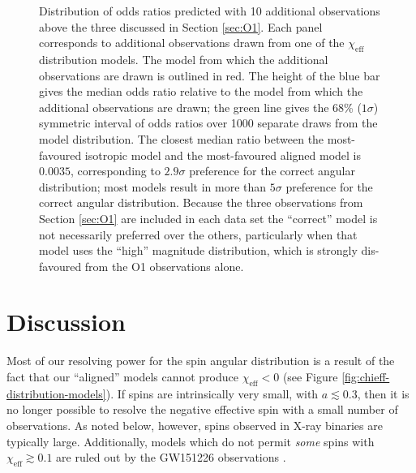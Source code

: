 \documentclass[modern,linenumbers]{aastex61}
\newcommand{\chieff}{\chi_\mathrm{eff}}
\newcommand{\OTwoSigmaIsoAlignedMin}{2.9}
\newcommand{\OTwoOddsIsoAlignedMin}{0.0035}
\begin{document}
\begin{figure}
  \caption{\label{fig:O2-predictions} Distribution of odds ratios
    predicted with 10 additional observations above the three
    discussed in Section \ref{sec:O1}.  Each panel corresponds to
    additional observations drawn from one of the $\chieff$
    distribution models.  The model from which the additional
    observations are drawn is outlined in red.  The height of the blue
    bar gives the median odds ratio relative to the model from which
    the additional observations are drawn; the green line gives the
    68\% ($1 \sigma$) symmetric interval of odds ratios over 1000
    separate draws from the model distribution.  The closest median
    ratio between the most-favoured isotropic model and the
    most-favoured aligned model is $\OTwoOddsIsoAlignedMin$,
    corresponding to $\OTwoSigmaIsoAlignedMin\sigma$ preference for
    the correct angular distribution; most models result in more than
    $5\sigma$ preference for the correct angular distribution.
    Because the three observations from Section \ref{sec:O1} are
    included in each data set the ``correct'' model is not necessarily
    preferred over the others, particularly when that model uses the
    ``high'' magnitude distribution, which is strongly dis-favoured
    from the O1 observations alone.}
\end{figure}

\section{Discussion}
\label{sec:discussion}

Most of our resolving power for the spin angular distribution is a
result of the fact that our ``aligned'' models cannot produce
$\chieff < 0$ (see Figure \ref{fig:chieff-distribution-models}).  If
spins are intrinsically very small, with $a \lesssim 0.3$, then it is
no longer possible to resolve the negative effective spin with a small
number of observations.  As noted below, however, spins observed in
X-ray binaries are typically large.  Additionally, models which do not
permit \emph{some} spins with $\chieff \gtrsim 0.1$ are ruled out by
the GW151226 observations \citep{2016PhRvL.116x1103A}.
\end{document}
